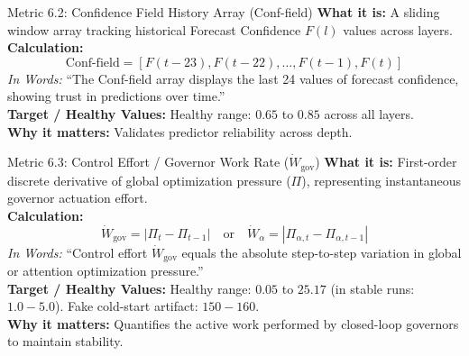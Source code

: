 \documentclass[11pt,a4paper]{article}
\begin{document}
\begin{metricbox}{Metric 6.2: Confidence Field History Array (Conf-field)}
\textbf{What it is:} A sliding window array tracking historical Forecast Confidence $F(l)$ values across layers.\\
\textbf{Calculation:}
 $$\text{Conf-field} = \left[F(t-23), F(t-22), \dots, F(t-1), F(t)\right]$$ \emph{In Words:} ``The Conf-field array displays the last 24 values of forecast confidence, showing trust in predictions over time.''\\
\textbf{Target / Healthy Values:} Healthy range: $0.65$ to $0.85$ across all layers.\\
\textbf{Why it matters:} Validates predictor reliability across depth.
\end{metricbox}

\begin{metricbox}{Metric 6.3: Control Effort / Governor Work Rate ($\dot{W}_{\text{gov}}$)}
\textbf{What it is:} First-order discrete derivative of global optimization pressure ($\Pi$), representing instantaneous governor actuation effort.\\
\textbf{Calculation:}
 $$\dot{W}_{\text{gov}} = |\Pi_t - \Pi_{t-1}| \quad \text{or} \quad \dot{W}_\alpha = |\Pi_{\alpha, t} - \Pi_{\alpha, t-1}|$$ \emph{In Words:} ``Control effort $\dot{W}_{\text{gov}}$ equals the absolute step-to-step variation in global or attention optimization pressure.''\\
\textbf{Target / Healthy Values:} Healthy range: $0.05$ to $25.17$ (in stable runs: $1.0 - 5.0$). Fake cold-start artifact: $150 - 160$.\\
\textbf{Why it matters:} Quantifies the active work performed by closed-loop governors to maintain stability.
\end{metricbox}
\end{document}
